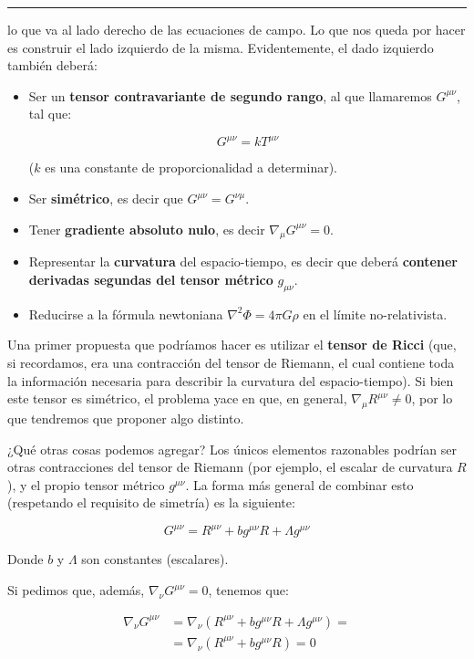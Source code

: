 \textcolor{myred}{\hrule}

 lo que va al lado derecho de las ecuaciones de campo. Lo que nos queda por hacer es construir el lado izquierdo de la misma. Evidentemente, el dado izquierdo también deberá:

\begin{itemize}
    \item Ser un \textbf{tensor contravariante de segundo rango}, al que llamaremos $G^{\mu\nu}$, tal que:
    
    $$G^{\mu\nu}=k T^{\mu\nu}$$
    
    ($k$ es una constante de proporcionalidad a determinar).
    
    \item Ser \textbf{simétrico}, es decir que $G^{\mu\nu}=G^{\nu\mu}$.
    \item Tener \textbf{gradiente absoluto nulo}, es decir $\nabla_{\mu}G^{\mu\nu}=0.$
    \item Representar la \textbf{curvatura} del espacio-tiempo, es decir que deberá \textbf{contener derivadas segundas del tensor métrico} $g_{\mu\nu}$.
    \item Reducirse a la fórmula newtoniana $\nabla^2\Phi=4\pi G \rho$ en el límite no-relativista.
\end{itemize}

Una primer propuesta que podríamos hacer es utilizar el \textbf{tensor de Ricci} (que, si recordamos, era una contracción del tensor de Riemann, el cual contiene toda la información necesaria para describir la curvatura del espacio-tiempo). Si bien este tensor es simétrico, el problema yace en que, en general, $\nabla_\mu R^{\mu\nu}\neq0$, por lo que tendremos que proponer algo distinto.

\vspace{0.5cm}

¿Qué otras cosas podemos agregar? Los únicos elementos razonables podrían ser otras contracciones del tensor de Riemann (por ejemplo, el escalar de curvatura $R$), y el propio tensor métrico $g^{\mu\nu}$. La forma más general de combinar esto (respetando el requisito de simetría) es la siguiente:

$$G^{\mu\nu}=R^{\mu\nu}+b g^{\mu\nu} R+\Lambda g^{\mu\nu}$$

Donde $b$ y $\Lambda$ son constantes (escalares).

Si pedimos que, además, $\nabla_{\nu}G^{\mu\nu}=0$, tenemos que:

\begin{equation}
\begin{split}
\nabla_{\nu}G^{\mu\nu}&=\nabla_{\nu}\left(R^{\mu\nu}+b g^{\mu\nu} R+\Lambda g^{\mu\nu}\right)=\\
&=\nabla_{\nu}\left(R^{\mu\nu}+b g^{\mu\nu} R\right)=0
\end{split}
\end{equation}


